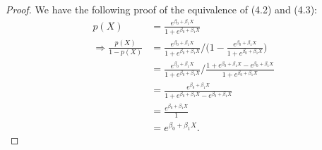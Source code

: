 \begin{proof}
    We have the following proof of the equivalence of (4.2) and (4.3):
    \begin{equation*}
        \begin{split}
            p(X) &= \frac{e^{\beta_0 + \beta_1 X}}{1 + e^{\beta_0 + \beta_1 X}} \\
            \Rightarrow \frac{p(X)}{1 - p(X)} &=
            \frac{e^{\beta_0 + \beta_1 X}}{1 + e^{\beta_0 + \beta_1 X}}
            / \biggl(1 - \frac{e^{\beta_0 + \beta_1 X}}{1 + e^{\beta_0 + \beta_1 X}}\biggr) \\
            &= \frac{e^{\beta_0 + \beta_1 X}}{1 + e^{\beta_0 + \beta_1 X}}
            / \frac{1 + e^{\beta_0 + \beta_1 X} - e^{\beta_0 + \beta_1 X}}
            {1 + e^{\beta_0 + \beta_1 X}} \\
            &= \frac{e^{\beta_0 + \beta_1 X}}
            {1 + e^{\beta_0 + \beta_1 X} - e^{\beta_0 + \beta_1 X}} \\
            &= \frac{e^{\beta_0 + \beta_1 X}}{1} \\
            &= e^{\beta_0 + \beta_1 X}.
        \end{split}
    \end{equation*}
\end{proof}
